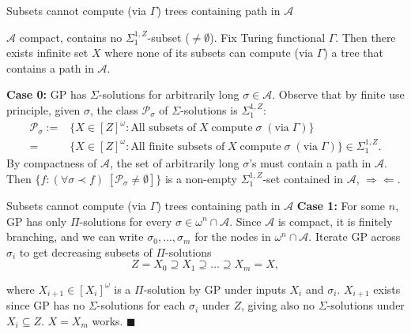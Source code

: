 \begin{frame}{Subsets cannot compute (via $\Gamma$) trees containing path
in $\mathcal{A}$}
  \begin{lemma}
    \label{lemma:fixed-machine}
    $\mathcal{A}$ compact, contains no $\Sigma_1^{1,Z}$-subset
    ($\neq\emptyset$). Fix Turing functional $\Gamma$. Then there exists
    infinite set $X$ where none of its subsets can compute (via $\Gamma$) a
    tree that contains a path in $\mathcal{A}$.
  \end{lemma}

  \vspace{0.5em}
  \textbf{Case 0:} GP has $\Sigma$-solutions for arbitrarily long
  $\sigma\in\mathcal{A}$. Observe that by finite use principle, given
  $\sigma$, the class $\mathcal{P}_{\sigma}$ of $\Sigma$-solutions is
  $\Sigma_1^{1,Z}$:
  \begin{align*}
    \mathcal{P}_{\sigma}:= &\{X\in[Z]^\omega: \text{All subsets of}\; X\;
      \text{compute}\; \sigma\; (\text{via}\; \Gamma)\}\\
    =&\{X\in[Z]^\omega: \text{All finite subsets of}\; X\;
      \text{compute}\; \sigma\; (\text{via}\; \Gamma)\}
      \in\Sigma_1^{1,Z}.
  \end{align*}
  By compactness of $\mathcal{A}$, the set of arbitrarily long $\sigma$'s
  must contain a path in $\mathcal{A}$. Then $\{f:(\forall \sigma\prec f)\;
  [\mathcal{P}_\sigma \neq \emptyset]\}$ is a non-empty
  $\Sigma_1^{1,Z}$-set contained in $\mathcal{A}$, $\Rightarrow\Leftarrow$.
\end{frame}

\begin{frame}{Subsets cannot compute (via $\Gamma$) trees containing path
in $\mathcal{A}$}
  \textbf{Case 1:} For some $n$, GP has only $\Pi$-solutions for every
  $\sigma\in\omega^n\cap\mathcal{A}$. Since $\mathcal{A}$ is compact, it is
  finitely branching, and we can write $\sigma_0,\ldots,\sigma_m$ for the
  nodes in $\omega^n\cap\mathcal{A}$. Iterate GP across $\sigma_i$ to get
  decreasing subsets of $\Pi$-solutions
  \[Z=X_0 \supseteq X_1 \supseteq \ldots\supseteq X_m=X,\]

  where $X_{i+1}\in[X_i]^\omega$ is a $\Pi$-solution by GP under
  inputs $X_i$ and $\sigma_i$. $X_{i+1}$ exists since GP has no
  $\Sigma$-solutions for each $\sigma_i$ under $Z$, giving also no
  $\Sigma$-solutions under $X_i\subseteq Z$. $X=X_m$ works. $\blacksquare$
\end{frame}

